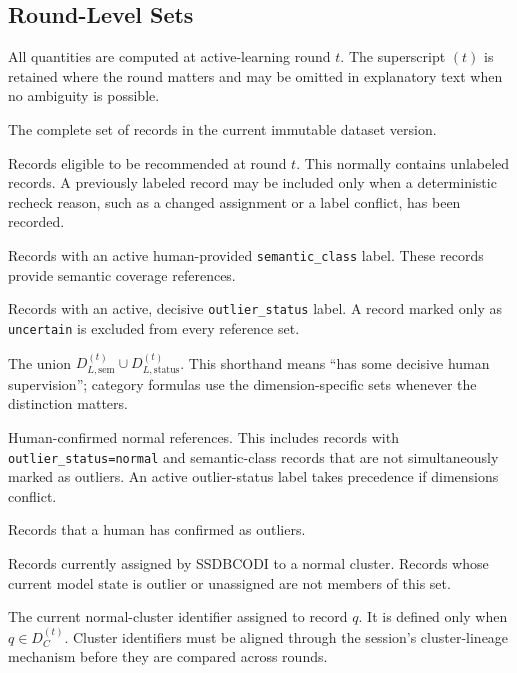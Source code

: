 \documentclass[11pt]{article}
\begin{document}
\subsection{Round-Level Sets}

All quantities are computed at active-learning round $t$. The superscript
$(t)$ is retained where the round matters and may be omitted in explanatory
text when no ambiguity is possible.

\begin{description}[leftmargin=3.2cm,style=nextline]
    \item[$D$]
    The complete set of records in the current immutable dataset version.

    \item[$U_t\subseteq D$]
    Records eligible to be recommended at round $t$. This normally contains
    unlabeled records. A previously labeled record may be included only when a
    deterministic recheck reason, such as a changed assignment or a label
    conflict, has been recorded.

    \item[$D_{L,\mathrm{sem}}^{(t)}\subseteq D$]
    Records with an active human-provided \texttt{semantic\_class} label.
    These records provide semantic coverage references.

    \item[$D_{L,\mathrm{status}}^{(t)}\subseteq D$]
    Records with an active, decisive \texttt{outlier\_status} label. A record
    marked only as \texttt{uncertain} is excluded from every reference set.

    \item[$D_L^{(t)}$]
    The union $D_{L,\mathrm{sem}}^{(t)}\cup
    D_{L,\mathrm{status}}^{(t)}$. This shorthand means ``has some decisive
    human supervision''; category formulas use the dimension-specific sets
    whenever the distinction matters.

    \item[$D_N^{(t)}\subseteq D_L^{(t)}$]
    Human-confirmed normal references. This includes records with
    \texttt{outlier\_status=normal} and semantic-class records that are not
    simultaneously marked as outliers. An active outlier-status label takes
    precedence if dimensions conflict.

    \item[$D_O^{(t)}\subseteq D_L^{(t)}$]
    Records that a human has confirmed as outliers.

    \item[$D_C^{(t)}\subseteq D$]
    Records currently assigned by SSDBCODI to a normal cluster. Records whose
    current model state is outlier or unassigned are not members of this set.

    \item[$c_t(q)$]
    The current normal-cluster identifier assigned to record $q$. It is defined
    only when $q\in D_C^{(t)}$. Cluster identifiers must be aligned through the
    session's cluster-lineage mechanism before they are compared across rounds.
\end{description}
\end{document}
